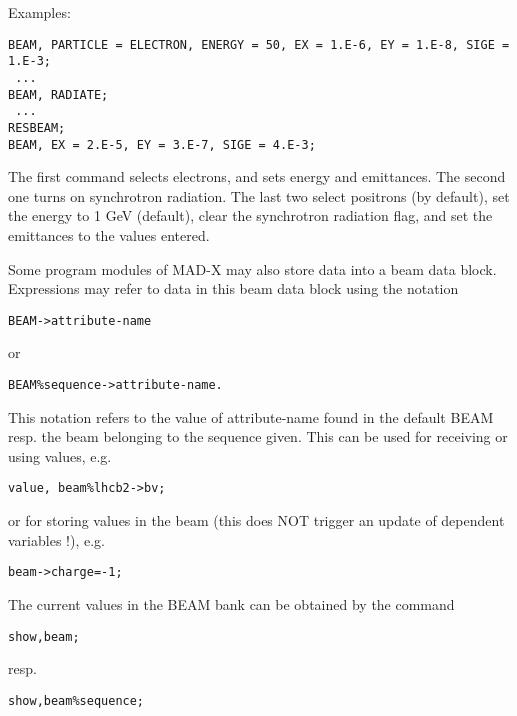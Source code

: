 Examples: 
\begin{verbatim}
BEAM, PARTICLE = ELECTRON, ENERGY = 50, EX = 1.E-6, EY = 1.E-8, SIGE = 1.E-3;
 ...
BEAM, RADIATE;
 ...
RESBEAM;
BEAM, EX = 2.E-5, EY = 3.E-7, SIGE = 4.E-3;
\end{verbatim} 

The first command selects electrons, and sets energy and emittances. The
second one turns on synchrotron radiation. The last two select positrons
(by default), set the energy to 1 GeV (default), clear the synchrotron
radiation flag, and set the emittances to the values entered.  

Some program modules of MAD-X may also store data into a beam data
block. Expressions may refer to data in this beam data block using the
notation  
\begin{verbatim}
BEAM->attribute-name
\end{verbatim} 
or 
\begin{verbatim}
BEAM%sequence->attribute-name.
\end{verbatim} 

This notation refers to the value of attribute-name found in the default
BEAM resp. the beam belonging to the sequence given. This can be used
for receiving or using values, e.g. 

\begin{verbatim}
value, beam%lhcb2->bv;
\end{verbatim} 
or for storing values in the beam (this does NOT trigger an update of dependent variables !), e.g. 
\begin{verbatim}
beam->charge=-1;
\end{verbatim} 

The current values in the BEAM bank can be obtained by the command
\begin{verbatim}
show,beam;
\end{verbatim}
resp.
\begin{verbatim}
show,beam%sequence;
\end{verbatim}


